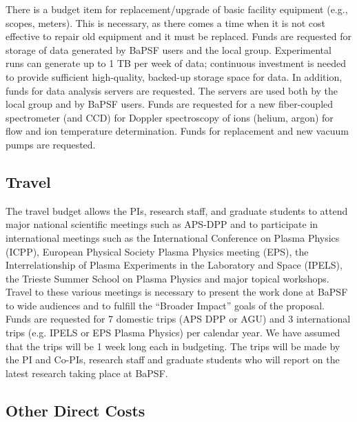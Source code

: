 \documentclass[11pt]{article}
\begin{document}
  There is a budget item for replacement/upgrade
of basic facility equipment (e.g., scopes, meters). This is necessary,
as there comes a time when it is not cost effective to repair old
equipment and it must be replaced. 
Funds are requested for storage of data generated by
BaPSF users and the local group.  Experimental runs can generate up to 1 TB
per week of data; continuous investment is needed to provide
sufficient high-quality, backed-up storage space for data.  In
addition, funds for data analysis servers are requested.  The servers
are used both by the local group and by BaPSF users.  Funds are
requested for a new fiber-coupled spectrometer (and CCD) for Doppler
spectroscopy of ions (helium, argon) for flow and ion temperature
determination.  Funds for replacement and new vacuum pumps are
requested.  


\subsection*{Travel}

The travel budget allows the PIs, research staff, and graduate students
to attend major national scientific meetings such as APS-DPP and to
participate in international meetings such as the International
Conference on Plasma Physics (ICPP), European Physical Society Plasma
Physics meeting (EPS), the Interrelationship of Plasma
Experiments in the Laboratory and Space (IPELS), the Trieste Summer
School on Plasma Physics and major topical workshops. Travel to these
various meetings is necessary to present the work done at BaPSF to
wide audiences and to fulfill the “Broader Impact” goals of the
proposal.  Funds are requested for 7 domestic trips (APS DPP or AGU) and 3
international trips (e.g. IPELS or EPS Plasma Physics) per calendar
year. We have assumed that the trips will be 1 week long each in budgeting.   The trips will be made by the PI and Co-PIs, research staff and graduate
students who will report on the latest research taking place at BaPSF.


\subsection*{Other Direct Costs}
\end{document}
